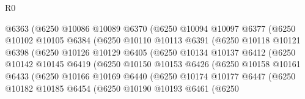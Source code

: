 \begin{lexlean}{R0}
\begin{coremodule}
                        @6363
                        (@6250
                          @10086
                          @10089
                          @6370
                          (@6250
                            @10094
                            @10097
                            @6377
                            (@6250
                              @10102
                              @10105
                              @6384
                              (@6250
                                @10110
                                @10113
                                @6391
                                (@6250
                                  @10118
                                  @10121
                                  @6398
                                  (@6250
                                    @10126
                                    @10129
                                    @6405
                                    (@6250
                                      @10134
                                      @10137
                                      @6412
                                      (@6250
                                        @10142
                                        @10145
                                        @6419
                                        (@6250
                                          @10150
                                          @10153
                                          @6426
                                          (@6250
                                            @10158
                                            @10161
                                            @6433
                                            (@6250
                                              @10166
                                              @10169
                                              @6440
                                              (@6250
                                                @10174
                                                @10177
                                                @6447
                                                (@6250
                                                  @10182
                                                  @10185
                                                  @6454
                                                  (@6250
                                                    @10190
                                                    @10193
                                                    @6461
                                                    (@6250

\end{coremodule}
\end{lexlean}
